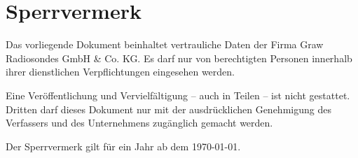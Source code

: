 \newpage


\section*{Sperrvermerk}
Das vorliegende Dokument beinhaltet vertrauliche Daten der Firma Graw Radiosondes GmbH \& Co. KG.
Es darf nur von berechtigten Personen innerhalb ihrer dienstlichen Verpflichtungen eingesehen werden.

Eine Veröffentlichung und Vervielfältigung – auch in Teilen – ist nicht gestattet.
Dritten darf dieses Dokument nur mit der ausdrücklichen Genehmigung des Verfassers und des Unternehmens zugänglich gemacht werden.

Der Sperrvermerk gilt für ein Jahr ab dem \today.
